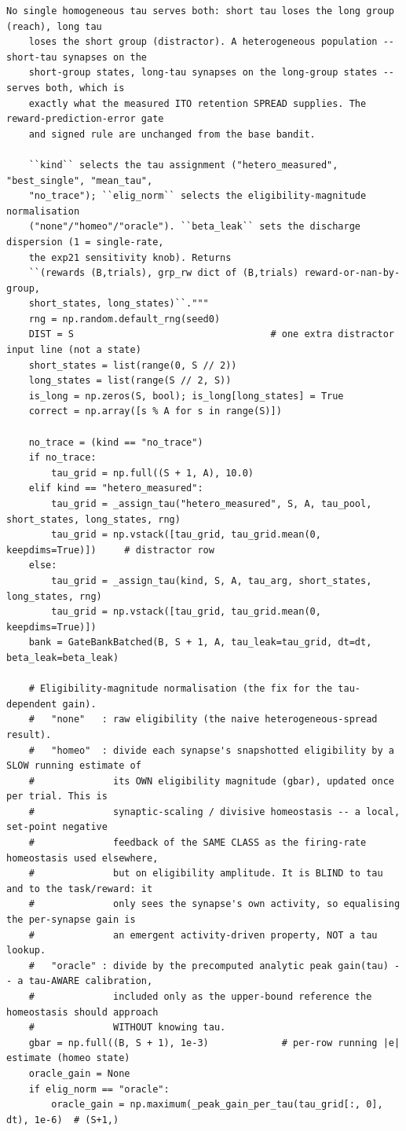 \begin{lstlisting}[caption={mrl\_trace/extensions.py},label={lst:siox-src-extensions}]
    No single homogeneous tau serves both: short tau loses the long group (reach), long tau
    loses the short group (distractor). A heterogeneous population -- short-tau synapses on the
    short-group states, long-tau synapses on the long-group states -- serves both, which is
    exactly what the measured ITO retention SPREAD supplies. The reward-prediction-error gate
    and signed rule are unchanged from the base bandit.

    ``kind`` selects the tau assignment ("hetero_measured", "best_single", "mean_tau",
    "no_trace"); ``elig_norm`` selects the eligibility-magnitude normalisation
    ("none"/"homeo"/"oracle"). ``beta_leak`` sets the discharge dispersion (1 = single-rate,
    the exp21 sensitivity knob). Returns
    ``(rewards (B,trials), grp_rw dict of (B,trials) reward-or-nan-by-group,
    short_states, long_states)``."""
    rng = np.random.default_rng(seed0)
    DIST = S                                   # one extra distractor input line (not a state)
    short_states = list(range(0, S // 2))
    long_states = list(range(S // 2, S))
    is_long = np.zeros(S, bool); is_long[long_states] = True
    correct = np.array([s % A for s in range(S)])

    no_trace = (kind == "no_trace")
    if no_trace:
        tau_grid = np.full((S + 1, A), 10.0)
    elif kind == "hetero_measured":
        tau_grid = _assign_tau("hetero_measured", S, A, tau_pool, short_states, long_states, rng)
        tau_grid = np.vstack([tau_grid, tau_grid.mean(0, keepdims=True)])     # distractor row
    else:
        tau_grid = _assign_tau(kind, S, A, tau_arg, short_states, long_states, rng)
        tau_grid = np.vstack([tau_grid, tau_grid.mean(0, keepdims=True)])
    bank = GateBankBatched(B, S + 1, A, tau_leak=tau_grid, dt=dt, beta_leak=beta_leak)

    # Eligibility-magnitude normalisation (the fix for the tau-dependent gain).
    #   "none"   : raw eligibility (the naive heterogeneous-spread result).
    #   "homeo"  : divide each synapse's snapshotted eligibility by a SLOW running estimate of
    #              its OWN eligibility magnitude (gbar), updated once per trial. This is
    #              synaptic-scaling / divisive homeostasis -- a local, set-point negative
    #              feedback of the SAME CLASS as the firing-rate homeostasis used elsewhere,
    #              but on eligibility amplitude. It is BLIND to tau and to the task/reward: it
    #              only sees the synapse's own activity, so equalising the per-synapse gain is
    #              an emergent activity-driven property, NOT a tau lookup.
    #   "oracle" : divide by the precomputed analytic peak gain(tau) -- a tau-AWARE calibration,
    #              included only as the upper-bound reference the homeostasis should approach
    #              WITHOUT knowing tau.
    gbar = np.full((B, S + 1), 1e-3)             # per-row running |e| estimate (homeo state)
    oracle_gain = None
    if elig_norm == "oracle":
        oracle_gain = np.maximum(_peak_gain_per_tau(tau_grid[:, 0], dt), 1e-6)  # (S+1,)


\end{lstlisting}
